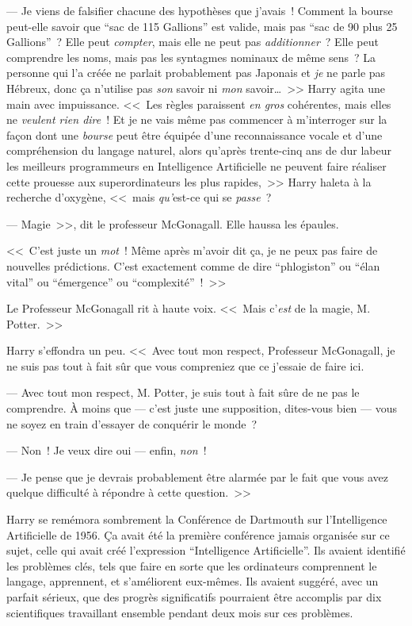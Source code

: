 --- Je viens de falsifier chacune des hypothèses que j'avais~! Comment la bourse peut-elle savoir que “sac de 115 Gallions” est valide, mais pas “sac de 90 plus 25 Gallions”~? Elle peut \emph{compter}, mais elle ne peut pas \emph{additionner}~? Elle peut comprendre les noms, mais pas les syntagmes nominaux de même sens~? La personne qui l'a créée ne parlait probablement pas Japonais et \emph{je} ne parle pas Hébreux, donc ça n'utilise pas \emph{son} savoir ni \emph{mon} savoir…~>> Harry agita une main avec impuissance. <<~Les règles paraissent \emph{en gros} cohérentes, mais elles ne \emph{veulent rien dire}~! Et je ne vais même pas commencer à m'interroger sur la façon dont une \emph{bourse} peut être équipée d'une reconnaissance vocale et d'une compréhension du langage naturel, alors qu'après trente-cinq ans de dur labeur les meilleurs programmeurs en Intelligence Artificielle ne peuvent faire réaliser cette prouesse aux superordinateurs les plus rapides,~>> Harry haleta à la recherche d'oxygène, <<~mais \emph{qu'}est-ce qui se \emph{passe}~?

--- Magie~>>, dit le professeur McGonagall. Elle haussa les épaules.

<<~C'est juste un \emph{mot}~! Même après m'avoir dit ça, je ne peux pas faire de nouvelles prédictions. C'est exactement comme de dire “phlogiston” ou “élan vital” ou “émergence” ou “complexité”~!~>>

Le Professeur McGonagall rit à haute voix. <<~Mais c'\emph{est} de la magie, M. Potter.~>>

Harry s'effondra un peu. <<~Avec tout mon respect, Professeur McGonagall, je ne suis pas tout à fait sûr que vous compreniez que ce j'essaie de faire ici.

--- Avec tout mon respect, M. Potter, je suis tout à fait sûre de ne pas le comprendre. À moins que — c'est juste une supposition, dites-vous bien — vous ne soyez en train d'essayer de conquérir le monde~?

--- Non~! Je veux dire oui — enfin, \emph{non}~!

--- Je pense que je devrais probablement être alarmée par le fait que vous avez quelque difficulté à répondre à cette question.~>>

Harry se remémora sombrement la Conférence de Dartmouth sur l'Intelligence Artificielle de 1956. Ça avait été la première conférence jamais organisée sur ce sujet, celle qui avait créé l'expression “Intelligence Artificielle”. Ils avaient identifié les problèmes clés, tels que faire en sorte que les ordinateurs comprennent le langage, apprennent, et s'améliorent eux-mêmes. Ils avaient suggéré, avec un parfait sérieux, que des progrès significatifs pourraient être accomplis par dix scientifiques travaillant ensemble pendant deux mois sur ces problèmes.

